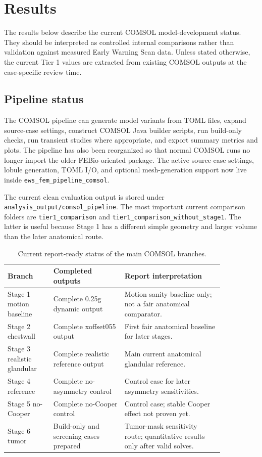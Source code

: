 \section{Results}

The results below describe the current COMSOL model-development status. They should be interpreted as controlled internal comparisons rather than validation against measured Early Warning Scan data. Unless stated otherwise, the current Tier 1 values are extracted from existing COMSOL outputs at the case-specific review time.

\subsection{Pipeline status}

The COMSOL pipeline can generate model variants from TOML files, expand source-case settings, construct COMSOL Java builder scripts, run build-only checks, run transient studies where appropriate, and export summary metrics and plots. The pipeline has also been reorganized so that normal COMSOL runs no longer import the older FEBio-oriented package. The active source-case settings, lobule generation, TOML I/O, and optional mesh-generation support now live inside \texttt{ews\_fem\_pipeline\_comsol}.

The current clean evaluation output is stored under \texttt{analysis\_output/comsol\_pipeline}. The most important current comparison folders are \texttt{tier1\_comparison} and \texttt{tier1\_comparison\_without\_stage1}. The latter is useful because Stage 1 has a different simple geometry and larger volume than the later anatomical route.

\begin{table}[H]
\centering
\scriptsize
\caption{Current report-ready status of the main COMSOL branches.}
\label{tab:completed_branches}
\begin{tabular}{p{0.18\linewidth} p{0.28\linewidth} p{0.39\linewidth}}
\toprule
Branch & Completed outputs & Report interpretation \\
\midrule
Stage 1 motion baseline & Complete 0.25g dynamic output & Motion sanity baseline only; not a fair anatomical comparator. \\
Stage 2 chestwall & Complete xoffset055 output & First fair anatomical baseline for later stages. \\
Stage 3 realistic glandular & Complete realistic reference output & Main current anatomical glandular reference. \\
Stage 4 reference & Complete no-asymmetry control & Control case for later asymmetry sensitivities. \\
Stage 5 no-Cooper & Complete no-Cooper control & Control case; stable Cooper effect not proven yet. \\
Stage 6 tumor & Build-only and screening cases prepared & Tumor-mask sensitivity route; quantitative results only after valid solves. \\
\bottomrule
\end{tabular}
\end{table}

